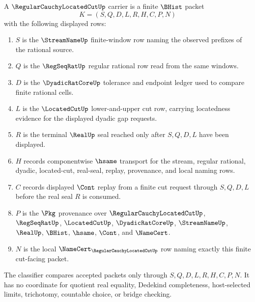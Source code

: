 \begin{definition}
\label{def:regular-cauchy-located-cut-carrier}
A $\RegularCauchyLocatedCutUp$ carrier is a finite $\BHist$ packet
$$
K=(S,Q,D,L,R,H,C,P,N)
$$
with the following displayed rows:
\begin{enumerate}
\item $S$ is the $\StreamNameUp$ finite-window row naming the observed prefixes of the rational source.
\item $Q$ is the $\RegSeqRatUp$ regular rational row read from the same windows.
\item $D$ is the $\DyadicRatCoreUp$ tolerance and endpoint ledger used to compare finite rational cells.
\item $L$ is the $\LocatedCutUp$ lower-and-upper cut row, carrying locatedness evidence for the displayed dyadic gap requests.
\item $R$ is the terminal $\RealUp$ seal reached only after $S,Q,D,L$ have been displayed.
\item $H$ records componentwise $\hsame$ transport for the stream, regular rational, dyadic, located-cut, real-seal, replay, provenance, and local naming rows.
\item $C$ records displayed $\Cont$ replay from a finite cut request through $S,Q,D,L$ before the real seal $R$ is consumed.
\item $P$ is the $\Pkg$ provenance over $\RegularCauchyLocatedCutUp$, $\RegSeqRatUp$, $\LocatedCutUp$, $\DyadicRatCoreUp$, $\StreamNameUp$, $\RealUp$, $\BHist$, $\hsame$, $\Cont$, and $\NameCert$.
\item $N$ is the local $\NameCert_{\RegularCauchyLocatedCutUp}$ row naming exactly this finite cut-facing packet.
\end{enumerate}
The classifier compares accepted packets only through $S,Q,D,L,R,H,C,P,N$. It has no coordinate for quotient real equality, Dedekind completeness, host-selected limits, trichotomy, countable choice, or bridge checking.
\end{definition}

